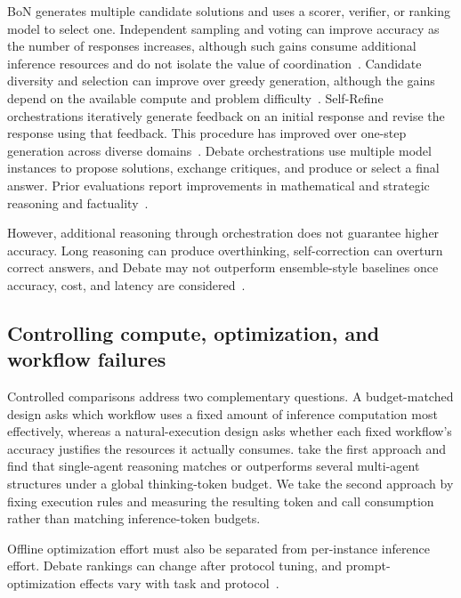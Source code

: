 \documentclass[a4paper]{article}
\theoremstyle{plain}
\theoremstyle{definition}
\theoremstyle{remark}
\begin{document}
BoN generates multiple candidate solutions and uses a scorer, verifier, or ranking model to select one.
Independent sampling and voting can improve accuracy as the number of responses increases, although such gains consume additional inference resources and do not isolate the value of coordination~\citep{li_more_2024}.
Candidate diversity and selection can improve over greedy generation, although the gains depend on the available compute and problem difficulty~\citep{snell_scaling_2025}.
Self-Refine orchestrations iteratively generate feedback on an initial response and revise the response using that feedback.
This procedure has improved over one-step generation across diverse domains~\citep{madaan_self-refine_2023}.
Debate orchestrations use multiple model instances to propose solutions, exchange critiques, and produce or select a final answer.
Prior evaluations report improvements in mathematical and strategic reasoning and factuality~\citep{du_improving_2024}.

However, additional reasoning through orchestration does not guarantee higher accuracy.
Long reasoning can produce overthinking, self-correction can overturn correct answers, and Debate may not outperform ensemble-style baselines once accuracy, cost, and latency are considered~\citep{chen_towards_2026,huang_large_2023,smit_should_2024}.

\subsection{Controlling compute, optimization, and workflow failures}

Controlled comparisons address two complementary questions.
A budget-matched design asks which workflow uses a fixed amount of inference computation most effectively, whereas a natural-execution design asks whether each fixed workflow's accuracy justifies the resources it actually consumes.
\citet{tran_single-agent_2026} take the first approach and find that single-agent reasoning matches or outperforms several multi-agent structures under a global thinking-token budget.
We take the second approach by fixing execution rules and measuring the resulting token and call consumption rather than matching inference-token budgets.

Offline optimization effort must also be separated from per-instance inference effort.
Debate rankings can change after protocol tuning, and prompt-optimization effects vary with task and protocol~\citep{smit_should_2024,bai_mas-promptbench_2026}.
\end{document}
